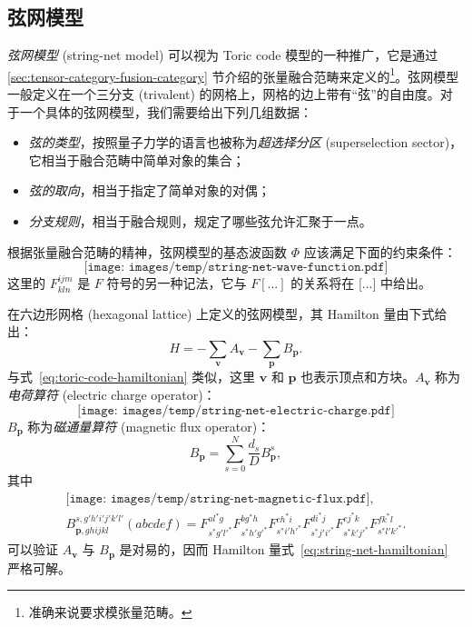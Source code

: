 \subsection{弦网模型}

\emph{弦网模型} (string-net model)\cite{levin2005string,levin2006detecting} 可以视为 Toric code 模型的一种推广，它是通过 \ref{sec:tensor-category-fusion-category} 节介绍的张量融合范畴来定义的\footnote{准确来说要求模张量范畴。}。弦网模型一般定义在一个三分支 (trivalent) 的网格上，网格的边上带有“弦”的自由度。对于一个具体的弦网模型，我们需要给出下列几组数据：
\begin{itemize}
  \item \emph{弦的类型}，按照量子力学的语言也被称为\emph{超选择分区} (superselection sector)，它相当于融合范畴中简单对象的集合；
  \item \emph{弦的取向}，相当于指定了简单对象的对偶；
  \item \emph{分支规则}，相当于融合规则，规定了哪些弦允许汇聚于一点。
\end{itemize}

根据张量融合范畴的精神，弦网模型的基态波函数 $\Phi$ 应该满足下面的约束条件：
\begin{equation}
  \texttt{[image: images/temp/string-net-wave-function.pdf]}
\end{equation}
这里的 $F^{ijm}_{kln}$ 是 $F$ 符号的另一种记法，它与 $F[...]$ 的关系将在 [...] 中给出。

在六边形网格 (hexagonal lattice) 上定义的弦网模型，其 Hamilton 量由下式给出：
\begin{equation}
  H = -\sum_{\bm{v}} A_{\bm{v}} - \sum_{\bm{p}} B_{\bm{p}}.
  \label{eq:string-net-hamiltonian}
\end{equation}
与式~\eqref{eq:toric-code-hamiltonian} 类似，这里 $\bm{v}$ 和 $\bm{p}$ 也表示顶点和方块。$A_{\bm{v}}$ 称为\emph{电荷算符} (electric charge operator)：
\begin{equation}
  \texttt{[image: images/temp/string-net-electric-charge.pdf]}
\end{equation}
$B_{\bm{p}}$ 称为\emph{磁通量算符} (magnetic flux operator)：
\begin{equation}
  B_{\bm{p}} = \sum_{s=0}^N \frac{d_s}{D} B_{\bm{p}}^s,
\end{equation}
其中
\begin{equation}
  \begin{gathered}
    \texttt{[image: images/temp/string-net-magnetic-flux.pdf]}, \\
    B_{\bm{p},ghijkl}^{s,g'h'i'j'k'l'}(abcdef) =
      F^{al^*g}_{s^*g'l'^*}
      F^{bg^*h}_{s^*h'g'^*}
      F^{ch^*i}_{s^*i'h'^*}
      F^{di^*j}_{s^*j'i'^*}
      F^{ej^*k}_{s^*k'j'^*}
      F^{fk^*l}_{s^*l'k'^*}.
  \end{gathered}
\end{equation}
可以验证 $A_{\bm{v}}$ 与 $B_{\bm{p}}$ 是对易的，因而 Hamilton 量式~\eqref{eq:string-net-hamiltonian} 严格可解。
